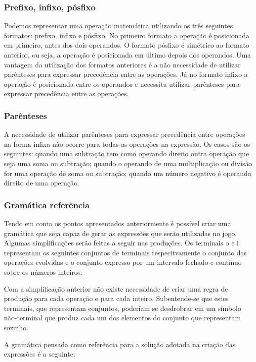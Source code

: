 \subsubsection{Prefixo, infixo, pósfixo}
Podemos representar uma operação matemática utilizando os três seguintes formatos: prefixo, infixo e pósfixo. No primeiro formato a operação é posicionada em primeiro, antes dos dois operandos. O formato pósfixo é simétrico ao formato anterior, ou seja, a operação é posicionada em último depois dos operandos. Uma vantagem da utilização dos formatos anteriores é a não necessidade de utilizar parênteses para expressar precedência entre as operações. Já no formato infixo a operação é posicionada entre os operandos e necessita utilizar parênteses para expressar precedência entre as operações.

\subsubsection{Parênteses}
A necessidade de utilizar parênteses para expressar precedência entre operações na forma infixa não ocorre para todas as operações na expressão. Os casos são os seguintes: quando uma subtração tem como operando direito outra operação que seja uma soma ou subtração; quando o operando de uma multiplicação ou divisão for uma operação de soma ou subtração; quando um número negativo é operando direito de uma operação.

\subsubsection{Gramática referência}
Tendo em conta os pontos apresentados anteriormente é possível criar uma gramática que seja capaz de gerar as expressões que serão utilizadas no jogo. Algumas simplificações serão feitas a seguir nas produções. Os terminais o e i representam os seguintes conjuntos de terminais respecitvamente o conjunto das operações evolvidas e o conjunto expresso por um intervalo fechado  e contínuo sobre os números inteiros.

	Com a simplificação anterior não existe necessidade de criar uma regra de produção para cada operação e para cada inteiro. Subentende-se que estes terminais, que representam conjuntos, poderiam se desdrobrar em um símbolo não-terminal que produz cada um dos elementos do conjunto que representam sozinho.
	
	A gramática pensada como referência para a solução adotada na criação das expressões é a seguinte:
	
